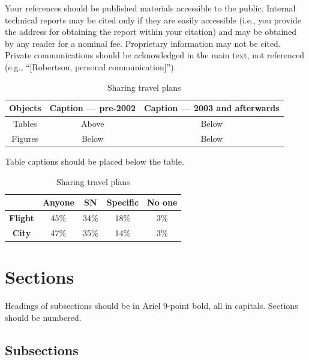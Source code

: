 \documentclass{scsSimAUDPaperFormat}
\newcommand\tabhead[1]{\small\textbf{#1}}
\begin{document}
Your references should be published materials accessible to the public. Internal technical reports may be cited only if they are easily accessible (i.e., you provide the address for obtaining the report within your citation) and may be obtained by any reader for a nominal fee. Proprietary information may not be cited. Private communications should be acknowledged in the main text, not referenced (e.g., “[Robertson, personal communication]”).

\begin{table}
  \centering
  \begin{tabular}{|c|c|c|}
    \hline
    \tabhead{Objects} &
    \multicolumn{1}{|p{0.3\columnwidth}|}{\centering\tabhead{Caption --- pre-2002}} &
    \multicolumn{1}{|p{0.4\columnwidth}|}{\centering\tabhead{Caption --- 2003 and afterwards}} \\
    \hline
    Tables & Above & Below \\
    \hline
    Figures & Below & Below \\
    \hline
  \end{tabular}
  \caption{Table captions should be placed below the table.}
  \label{tab:table1}
  \hfill \break
  \centering
  \begin{tabular}{|c|c|c|c|c|}
	\hline
	\tabhead{} &
	\multicolumn{1}{|p{0.15\columnwidth}|}{\centering\tabhead{Anyone}} &
	\multicolumn{1}{|p{0.15\columnwidth}|}{\centering\tabhead{SN}} &
	\multicolumn{1}{|p{0.15\columnwidth}|}{\centering\tabhead{Specific}} &
	\multicolumn{1}{|p{0.15\columnwidth}|}{\centering\tabhead{No one}} \\
	\hline
	\textbf{Flight} & 45\% & 34\% & 18\% & 3\% \\
	\hline
	\textbf{City} & 47\% & 35\% & 14\% & 3\% \\
	\hline
  \end{tabular}
  \caption{Sharing travel plans}
  \label{tab:table2}
\end{table}

\section{Sections}

Headings of subsections should be in Ariel 9-point bold, all in capitals. Sections should be numbered. 

\subsection{Subsections}
\end{document}
